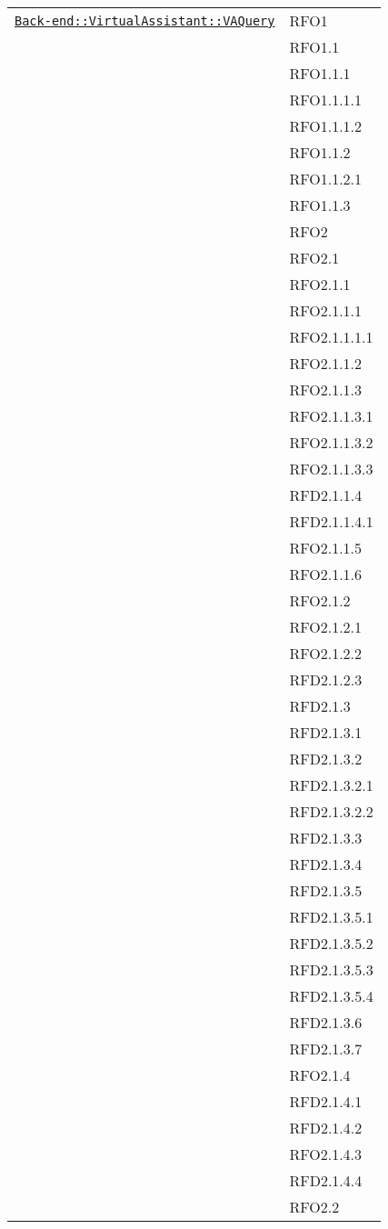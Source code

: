 \begin{longtable}{|>{\centering}m{10cm}|m{3cm}<{\centering}|}
\hyperref[Back-end::VirtualAssistant::VAQuery]{\texttt{Back-end::VirtualAssistant::VAQuery}} & RFO1\\
& RFO1.1\\
& RFO1.1.1\\
& RFO1.1.1.1\\
& RFO1.1.1.2\\
& RFO1.1.2\\
& RFO1.1.2.1\\
& RFO1.1.3\\
& RFO2\\
& RFO2.1\\
& RFO2.1.1\\
& RFO2.1.1.1\\
& RFO2.1.1.1.1\\
& RFO2.1.1.2\\
& RFO2.1.1.3\\
& RFO2.1.1.3.1\\
& RFO2.1.1.3.2\\
& RFO2.1.1.3.3\\
& RFD2.1.1.4\\
& RFD2.1.1.4.1\\
& RFO2.1.1.5\\
& RFO2.1.1.6\\
& RFO2.1.2\\
& RFO2.1.2.1\\
& RFO2.1.2.2\\
& RFD2.1.2.3\\
& RFD2.1.3\\
& RFD2.1.3.1\\
& RFD2.1.3.2\\
& RFD2.1.3.2.1\\
& RFD2.1.3.2.2\\
& RFD2.1.3.3\\
& RFD2.1.3.4\\
& RFD2.1.3.5\\
& RFD2.1.3.5.1\\
& RFD2.1.3.5.2\\
& RFD2.1.3.5.3\\
& RFD2.1.3.5.4\\
& RFD2.1.3.6\\
& RFD2.1.3.7\\
& RFO2.1.4\\
& RFD2.1.4.1\\
& RFD2.1.4.2\\
& RFO2.1.4.3\\
& RFD2.1.4.4\\
& RFO2.2\\

\end{longtable}
